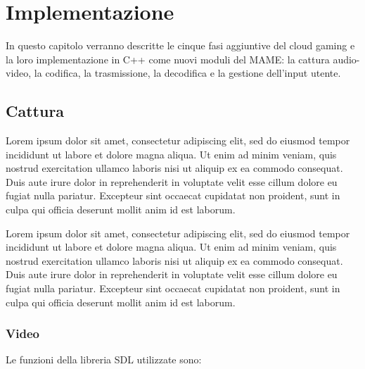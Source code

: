 %
%
\chapter{Implementazione}
In questo capitolo verranno descritte le cinque fasi aggiuntive del cloud gaming e la loro implementazione in C++ come nuovi moduli del MAME: la cattura audio-video, la codifica, la trasmissione, la decodifica e la gestione dell'input utente.




\section{Cattura}
Lorem ipsum dolor sit amet, consectetur adipiscing elit, sed do eiusmod tempor incididunt ut labore et dolore magna aliqua. Ut enim ad minim veniam, quis nostrud exercitation ullamco laboris nisi ut aliquip ex ea commodo consequat. Duis aute irure dolor in reprehenderit in voluptate velit esse cillum dolore eu fugiat nulla pariatur. Excepteur sint occaecat cupidatat non proident, sunt in culpa qui officia deserunt mollit anim id est laborum.

Lorem ipsum dolor sit amet, consectetur adipiscing elit, sed do eiusmod tempor incididunt ut labore et dolore magna aliqua. Ut enim ad minim veniam, quis nostrud exercitation ullamco laboris nisi ut aliquip ex ea commodo consequat. Duis aute irure dolor in reprehenderit in voluptate velit esse cillum dolore eu fugiat nulla pariatur. Excepteur sint occaecat cupidatat non proident, sunt in culpa qui officia deserunt mollit anim id est laborum.


\subsection{Video}
Le funzioni della libreria SDL utilizzate sono:

